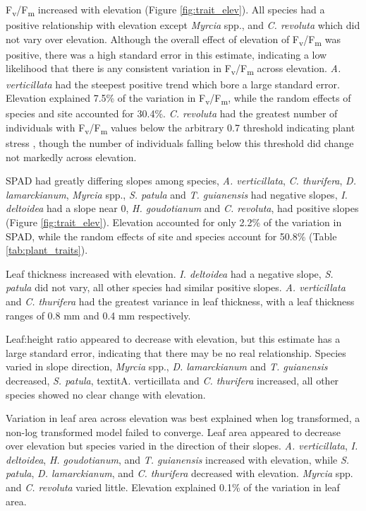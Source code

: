 \documentclass[a4paper,10pt,]{report}
\begin{document}
F\textsubscript{v}/F\textsubscript{m} increased with elevation (Figure \ref{fig:trait_elev}). All species had a positive relationship with elevation except \textit{Myrcia} spp., and \textit{C. revoluta} which did not vary over elevation. Although the overall effect of elevation of F\textsubscript{v}/F\textsubscript{m} was positive, there was a high standard error in this estimate, indicating a low likelihood that there is any consistent variation in F\textsubscript{v}/F\textsubscript{m} across elevation. \textit{A. verticillata} had the steepest positive trend which bore a large standard error. Elevation explained 7.5\% of the variation in F\textsubscript{v}/F\textsubscript{m}, while the random effects of species and site accounted for 30.4\%. \textit{C. revoluta} had the greatest number of individuals with F\textsubscript{v}/F\textsubscript{m} values below the arbitrary 0.7 threshold indicating plant stress \citep{Maxwell2000}, though the number of individuals falling below this threshold did change not markedly across elevation.

SPAD had greatly differing slopes among species, \textit{A. verticillata}, \textit{C. thurifera}, \textit{D. lamarckianum}, \textit{Myrcia} spp., \textit{S. patula} and \textit{T. guianensis} had negative slopes, \textit{I. deltoidea} had a slope near 0, \textit{H. goudotianum} and \textit{C. revoluta}, had positive slopes (Figure \ref{fig:trait_elev}). Elevation accounted for only 2.2\% of the variation in SPAD, while the random effects of site and species account for 50.8\% (Table \ref{tab:plant_traits}).

Leaf thickness increased with elevation. \textit{I. deltoidea}  had a negative slope, \textit{S. patula} did not vary, all other species had similar positive slopes. \textit{A. verticillata} and \textit{C. thurifera} had the greatest variance in leaf thickness, with a leaf thickness ranges of 0.8 mm and 0.4 mm respectively. 

Leaf:height ratio appeared to decrease with elevation, but this estimate has a large standard error, indicating that there may be no real relationship. Species varied in slope direction, \textit{Myrcia} spp., \textit{D. lamarckianum} and \textit{T. guianensis} decreased, \textit{S. patula}, textit{A. verticillata} and \textit{C. thurifera} increased, all other species showed no clear change with elevation.

Variation in leaf area across elevation was best explained when log transformed, a non-log transformed model failed to converge. Leaf area appeared to decrease over elevation but species varied in the direction of their slopes. \textit{A. verticillata}, \textit{I. deltoidea}, \textit{H. goudotianum}, and \textit{T. guianensis} increased with elevation, while \textit{S. patula}, \textit{D. lamarckianum}, and \textit{C. thurifera} decreased with elevation. \textit{Myrcia} spp. and \textit{C. revoluta} varied little. Elevation explained 0.1\% of the variation in leaf area.
\end{document}
